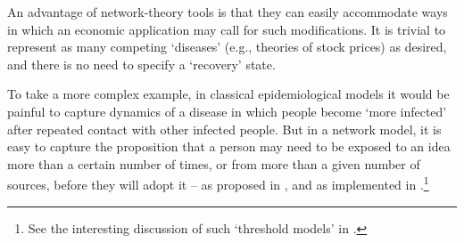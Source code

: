An advantage of network-theory tools is that they can easily accommodate ways in which an economic application may call for such modifications.  It is trivial  to represent as many competing `diseases' (e.g., theories of stock prices) as desired, and there is no need to specify a `recovery' state.

To take a more complex example, in classical epidemiological models it would be painful to capture dynamics of a disease in which people become  `more infected' after repeated contact with other infected people.  But in a network model, it is easy to capture the proposition that a person may need to be exposed to an idea more than a certain number of times, or from more than a given number of sources, before they will adopt it -- as proposed in \cite{granovetter1978threshold}, and as implemented in \cite{jackson2007diffusion}.\footnote{See the interesting discussion of such `threshold models' in \cite{glasserman2016contagion}.}



